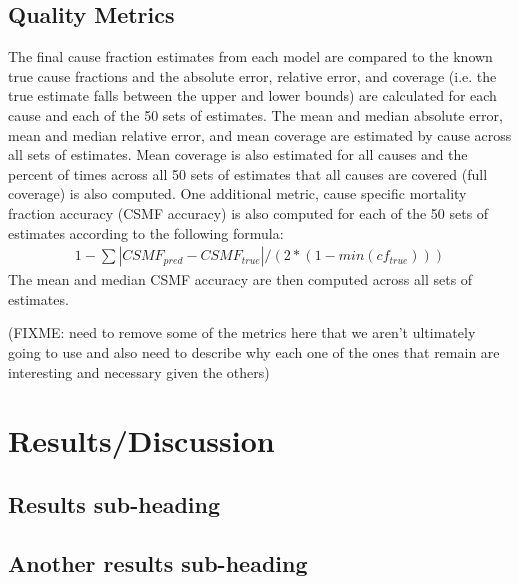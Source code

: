 \documentclass[10pt]{bmc_article}
\newenvironment{bmcformat}{\begin{raggedright}\baselineskip20pt\sloppy\setboolean{publ}{false}}{\end{raggedright}\baselineskip20pt\sloppy}
\begin{document}
\begin{bmcformat}
  \subsection*{Quality Metrics}
    The final cause fraction estimates from each model are compared to the known true cause 
    fractions and the absolute error, relative error, and coverage (i.e. the true estimate
    falls between the upper and lower bounds) are calculated for each cause and each 
    of the 50 sets of estimates. The mean and median absolute error, mean and 
    median relative error, and mean coverage are estimated by cause across all sets of 
    estimates. Mean coverage is also estimated for all causes and the 
    percent of times across all 50 sets of estimates that all causes are covered (full 
    coverage) is also computed. One additional metric, cause specific mortality fraction 
    accuracy (CSMF accuracy) is also computed for each of the 50 sets of estimates 
    according to the following formula: 
  \begin{align*}
    1-\sum \left | CSMF_{pred} - CSMF_{true} \right |/(2*(1-min(cf_{true})))
  \end{align*}
    The mean and median CSMF accuracy are then computed across all sets of estimates. \pb 

    (FIXME: need to remove some of the metrics here that we aren't ultimately going to 
    use and also need to describe why each one of the ones that remain are interesting 
    and necessary given the others) \pb 


\section*{Results/Discussion}
  \subsection*{Results sub-heading}

  \subsection*{Another results sub-heading}


\end{bmcformat}
\end{document}
